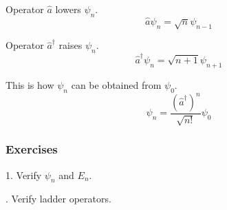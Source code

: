 Operator $\hat a$ lowers $\psi_n$.
\begin{equation*}
\hat a\psi_n=\sqrt n\psi_{n-1}
\end{equation*}

Operator $\hat a^\dag$ raises $\psi_n$.
\begin{equation*}
\hat a^\dag\psi_n=\sqrt{n+1}\psi_{n+1}
\end{equation*}

This is how $\psi_n$ can be obtained from $\psi_0$.
\begin{equation*}
\psi_n=\frac{(\hat a^\dag)^n}{\sqrt{n!}}\psi_0
\end{equation*}

\subsubsection*{Exercises}

1. Verify $\psi_n$ and $E_n$.

. Verify ladder operators.



